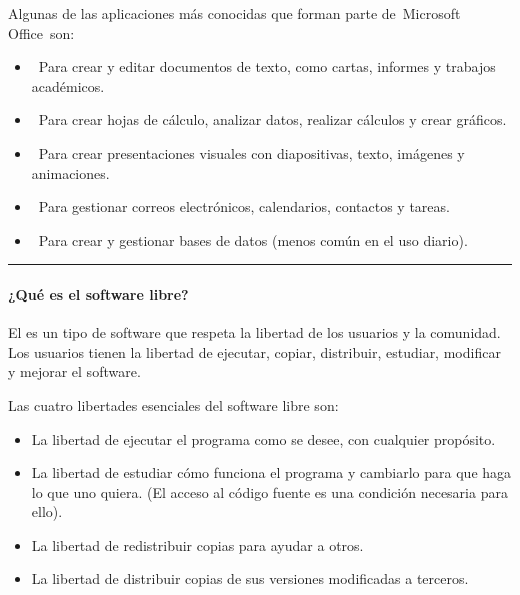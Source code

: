 \documentclass[letterpaper,10pt,spanish]{sphinxmanual}
\begin{document}
\sphinxAtStartPar
Algunas de las aplicaciones más conocidas que forman parte de Microsoft Office son:
\begin{itemize}
\item {} 
\sphinxAtStartPar
{} Para crear y editar documentos de texto, como cartas, informes y trabajos académicos.

\item {} 
\sphinxAtStartPar
{} Para crear hojas de cálculo, analizar datos, realizar cálculos y crear gráficos.

\item {} 
\sphinxAtStartPar
{} Para crear presentaciones visuales con diapositivas, texto, imágenes y animaciones.

\item {} 
\sphinxAtStartPar
{} Para gestionar correos electrónicos, calendarios, contactos y tareas.

\item {} 
\sphinxAtStartPar
{} Para crear y gestionar bases de datos (menos común en el uso diario).

\end{itemize}


\bigskip\hrule\bigskip



\paragraph{¿Qué es el software libre?}
\label{\detokenize{cursos/ofimatica10/periodo01/R01:que-es-el-software-libre}}
\sphinxAtStartPar
El  es un tipo de software que respeta la libertad de los usuarios y la comunidad. Los usuarios tienen la libertad de ejecutar, copiar, distribuir, estudiar, modificar y mejorar el software.

\sphinxAtStartPar
Las cuatro libertades esenciales del software libre son:
\begin{itemize}
\item {} 
\sphinxAtStartPar
{} La libertad de ejecutar el programa como se desee, con cualquier propósito.

\item {} 
\sphinxAtStartPar
{} La libertad de estudiar cómo funciona el programa y cambiarlo para que haga lo que uno quiera. (El acceso al código fuente es una condición necesaria para ello).

\item {} 
\sphinxAtStartPar
{} La libertad de redistribuir copias para ayudar a otros.

\item {} 
\sphinxAtStartPar
{} La libertad de distribuir copias de sus versiones modificadas a terceros.

\end{itemize}
\end{document}
